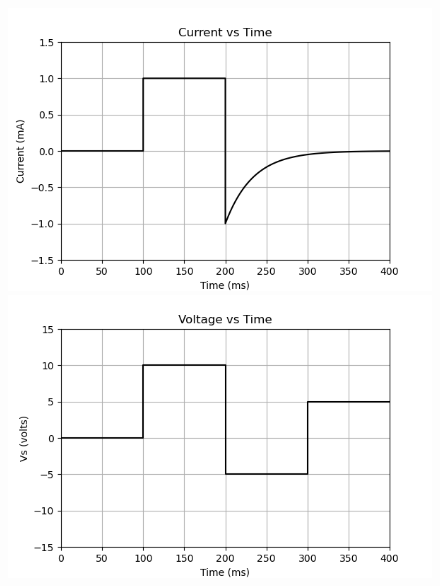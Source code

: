 \begin{figure}[ht]
\centering
    \begin{minipage}[b]{0.3\linewidth} %
        \includegraphics[width=0.9\linewidth]{figs/graphs/Figure_1.png} %
    \end{minipage}
    \hspace{0.02\linewidth} %
    \begin{minipage}[b]{0.3\linewidth} %
        \includegraphics[width=0.9\linewidth]{figs/graphs/Figure_2.png} %
    \end{minipage}
\end{figure}
